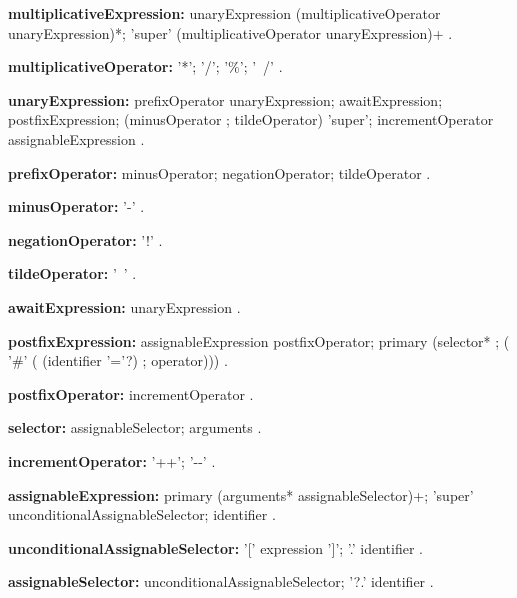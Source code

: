 \begin{grammar}
{\bf multiplicativeExpression:}
    unaryExpression (multiplicativeOperator unaryExpression)*;
    'super' (multiplicativeOperator unaryExpression)+
    .

{\bf multiplicativeOperator:}
    '*';
    '/';
    '\%';
    '~/'
    .    
\end{grammar}
\begin{grammar}
{\bf unaryExpression:}
    prefixOperator unaryExpression;
    awaitExpression;
    postfixExpression;
    (minusOperator ; tildeOperator) 'super';
    incrementOperator assignableExpression
    .
 
{\bf prefixOperator:}
    minusOperator;
    negationOperator;
    tildeOperator
    .

{\bf minusOperator:}
    '-'
    .

{\bf negationOperator:}
    '!'
    .
      
{\bf tildeOperator:}
    '~'
    .
\end{grammar}
\begin{grammar}
{\bf awaitExpression:}
    \AWAIT{} unaryExpression
    .
\end{grammar}
\begin{grammar}
{\bf postfixExpression:}
    assignableExpression postfixOperator;
    primary (selector* ; ( '\#' ( (identifier '='?) ; operator)))
    .

{\bf postfixOperator:}
    incrementOperator
    .

{\bf selector:}
    assignableSelector;
    arguments
    .

{\bf incrementOperator:}
    '++';
    '-{}-'
    .        
\end{grammar}
\begin{grammar}
{\bf assignableExpression:}
    primary (arguments* assignableSelector)+;
    'super' unconditionalAssignableSelector;
    identifier
    .
    
{\bf unconditionalAssignableSelector:}
    '[' expression ']';
    '.' identifier
    .

{\bf assignableSelector:}
    unconditionalAssignableSelector;
    '?.' identifier
    .
\end{grammar}
